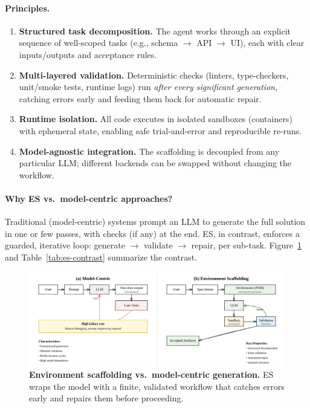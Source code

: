 \documentclass[conference]{IEEEtran}
\begin{document}
\paragraph{Principles.}
\begin{enumerate}
  \item \textbf{Structured task decomposition.} The agent works through an explicit sequence of well-scoped tasks (e.g., schema $\rightarrow$ API $\rightarrow$ UI), each with clear inputs/outputs and acceptance rules.
  \item \textbf{Multi-layered validation.} Deterministic checks (linters, type-checkers, unit/smoke tests, runtime logs) run \emph{after every significant generation}, catching errors early and feeding them back for automatic repair.
  \item \textbf{Runtime isolation.} All code executes in isolated sandboxes (containers) with ephemeral state, enabling safe trial-and-error and reproducible re-runs.
  \item \textbf{Model-agnostic integration.} The scaffolding is decoupled from any particular LLM; different backends can be swapped without changing the workflow.
\end{enumerate}

\paragraph{Why ES vs.\ model-centric approaches?}
Traditional (model-centric) systems prompt an LLM to generate the full solution in one or few passes, with checks (if any) at the end. ES, in contrast, enforces a guarded, iterative loop: generate $\rightarrow$ validate $\rightarrow$ repair, per sub-task. Figure~\ref{fig:es-vs-model} and Table~\ref{tab:es-contrast} summarize the contrast.

\begin{figure}[t]
  \centering
  \includegraphics[width=\linewidth]{diagrams/es-vs-model.png}
  \caption{\textbf{Environment scaffolding vs.\ model-centric generation.} ES wraps the model with a finite, validated workflow that catches errors early and repairs them before proceeding.}
  \label{fig:es-vs-model}
\end{figure}
\end{document}
